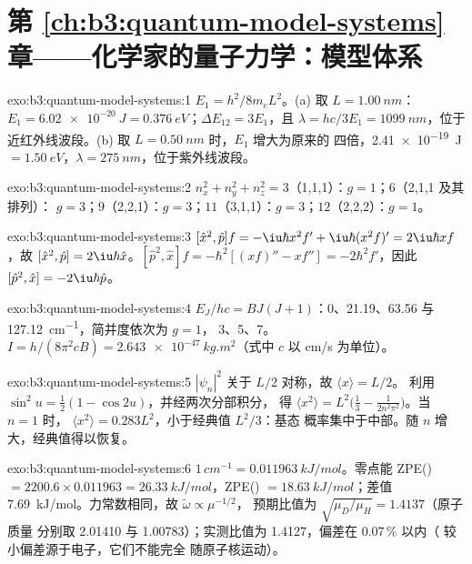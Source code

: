\section*{第 \ref{ch:b3:quantum-model-systems} 章——化学家的量子力学：模型体系}

\begin{solution}{exo:b3:quantum-model-systems:1}
$E_1 = h^2/8m_eL^2$。(a) 取 $L = \qty{1.00}{nm}$：$E_1 = \qty{6.02e-20}{J} =
\qty{0.376}{eV}$；$\Delta E_{12} = 3E_1$，且 $\lambda = hc/3E_1 =
\qty{1099}{nm}$，位于近红外线波段。(b) 取 $L = \qty{0.50}{nm}$ 时，$E_1$ 增大为原来的
四倍，\qty{2.41e-19}{J} $= \qty{1.50}{eV}$，$\lambda =
\qty{275}{nm}$，位于紫外线波段。
\end{solution}

\begin{solution}{exo:b3:quantum-model-systems:2}
$n_x^2 + n_y^2 + n_z^2 = 3$（1,1,1）：$g = 1$；$6$（2,1,1 及其排列）：
$g = 3$；$9$（2,2,1）：$g = 3$；$11$（3,1,1）：$g = 3$；$12$（2,2,2）：$g = 1$。
\end{solution}

\begin{solution}{exo:b3:quantum-model-systems:3}
$[\hat x^2,\hat p]f = -\iu\hbar x^2f' + \iu\hbar(x^2f)' = 2\iu\hbar xf$，故
$[\hat x^2,\hat p] = 2\iu\hbar\hat x$。$[\hat p^2,\hat x]f = -\hbar^2[(xf)'' -
xf''] = -2\hbar^2f'$，因此 $[\hat p^2,\hat x] = -2\iu\hbar\hat p$。
\end{solution}

\begin{solution}{exo:b3:quantum-model-systems:4}
$E_J/hc = BJ(J+1)$：0、21.19、63.56 与 \qty{127.12}{cm^{-1}}，简并度依次为 $g = 1$，
3、5、7。$I = h/(8\pi^2cB) = \qty{2.643e-47}{kg.m^2}$（式中 $c$ 以
\unit{cm/s} 为单位）。
\end{solution}

\begin{solution}{exo:b3:quantum-model-systems:5}
$|\psi_n|^2$ 关于 $L/2$ 对称，故 $\langle x\rangle = L/2$。
利用 $\sin^2u = \frac12(1 - \cos2u)$，并经两次分部积分，
得 $\langle x^2\rangle = L^2\big(\frac13 - \frac{1}{2n^2\pi^2}\big)$。当 $n = 1$ 时，
$\langle x^2\rangle = 0.283L^2$，小于经典值 $L^2/3$：基态
概率集中于中部。随 $n$ 增大，经典值得以恢复。
\end{solution}

\begin{solution}{exo:b3:quantum-model-systems:6}
$1\,\unit{cm^{-1}} = \qty{0.011963}{kJ/mol}$。零点能 ZPE() $= 2200.6 \times
0.011963 = \qty{26.33}{kJ/mol}$，ZPE() $= \qty{18.63}{kJ/mol}$；差值
\qty{7.69}{kJ/mol}。力常数相同，故 $\tilde\omega \propto \mu^{-1/2}$，
预期比值为 $\sqrt{\mu_D/\mu_H} = 1.4137$（原子质量
分别取 2.01410 与 1.00783）；实测比值为 1.4127，偏差在 0.07\,\% 以内（
较小偏差源于电子，它们不能完全
随原子核运动）。
\end{solution}

